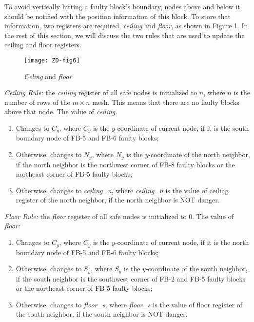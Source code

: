 To avoid vertically hitting a faulty block’s boundary, nodes above and below it should be notified with the position information of this block. To store that information, two registers are required, \textit{ceiling} and \textit{floor}, as shown in Figure \ref{fig:ZD-fig6}. In the rest of this section, we will discuss the two rules that are used to update the ceiling and floor registers.
\begin{figure}[h]
    \centering
        \texttt{[image: ZD-fig6]}
          \caption{\textit{Celing} and \textit{floor}}
        \label{fig:ZD-fig6}
\end{figure}


\textit{Ceiling Rule:} the \textit{ceiling} register of all safe nodes is initialized to $n$, where $n$ is the number of rows of the $m \times n$ mesh. This means that there are no faulty blocks above that node. The value of \textit{ceiling}.

\begin{enumerate}[1)]
    \item Changes to $C_{y}$, where $C_{y}$ is the $y$-coordinate of current node, if it is the south boundary node of FB-5 and FB-6 faulty blocks;

    \item Otherwise, changes to $N_{y}$, where $N_{y}$ is the $y$-coordinate of the north neighbor, if the north neighbor is the northwest corner of FB-8 faulty blocks or the northeast corner of FB-5 faulty blocks;

    \item Otherwise, changes to \textit{ceiling\_n}, where \textit{ceiling\_n} is the value of ceiling register of the north neighbor, if the north neighbor is NOT danger.
\end{enumerate}

\textit{Floor Rule:} the \textit{floor} register of all safe nodes is initialized to 0. The value of \textit{floor:}

\begin{enumerate}[1)]
    \item Changes to $C_{y}$, where $C_{y}$ is the $y$-coordinate of current node, if it is the north boundary node of FB-5 and FB-6 faulty blocks;
    \item Otherwise, changes to $S_{y}$, where $S_{y}$ is the $y$-coordinate of the south neighbor, if the south neighbor is the southwest corner of FB-2 and FB-5 faulty blocks or the northeast corner of FB-5 faulty blocks;
    \item Otherwise, changes to \textit{floor\_s}, where \textit{floor\_s} is the value of floor register of the south neighbor, if the south neighbor is NOT danger.
\end{enumerate}

